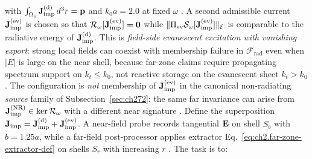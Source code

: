 with \(\int_{\Omega_s}\mathbf{J}_{\mathrm{imp}}^{(\mathrm{d})}\,d^{3}r=\mathbf{p}\) and \(k_0 a=2.0\) at fixed
\(\omega\) . A second admissible current
\(\mathbf{J}_{\mathrm{imp}}^{(\mathrm{ev})}\) is chosen so that
\(\mathcal{R}_\omega[\mathbf{J}_{\mathrm{imp}}^{(\mathrm{ev})}]=\mathbf{0}\) while
\(\|\Pi_{\mathrm{ev}}\mathcal{S}_\omega[\mathbf{J}_{\mathrm{imp}}^{(\mathrm{ev})}]\|_{\mathcal{E}}\) is comparable to
the radiative energy of \(\mathbf{J}_{\mathrm{imp}}^{(\mathrm{d})}\). This is
\emph{field-side evanescent excitation with vanishing export}: strong local fields can coexist
with membership failure in $\mathcal{F}_{\mathrm{rad}}$ even when $|E|$ is large on the near
shell, because far-zone claims require propagating spectrum support on $k_t\le k_0$, not
reactive storage on the evanescent sheet $k_t>k_0$ \cite{reed1950}. The configuration is
\emph{not} membership of
\(\mathbf{J}_{\mathrm{imp}}^{(\mathrm{ev})}\) in the canonical non-radiating \emph{source} family of
Subsection~\ref{sec:ch272}: the same far invariance can arise from \(\mathbf{J}_{\mathrm{imp}}^{\mathrm{(NR)}}\in\ker\mathcal{R}_\omega\)
with a different near signature \cite{reed1950}. Define the
superposition \(\mathbf{J}_{\mathrm{imp}}=\mathbf{J}_{\mathrm{imp}}^{(\mathrm{d})}+\mathbf{J}_{\mathrm{imp}}^{(\mathrm{ev})}\). A near-field probe records
tangential \(\mathbf{E}\) on shell \(S_b\) with \(b=1.25a\), while a far-field post-processor applies
extractor Eq.~\eqref{eq:ch2.far-zone-extractor-def} on shells \(S_r\) with increasing \(r\)
\cite{harrington2001}. The task is to:
